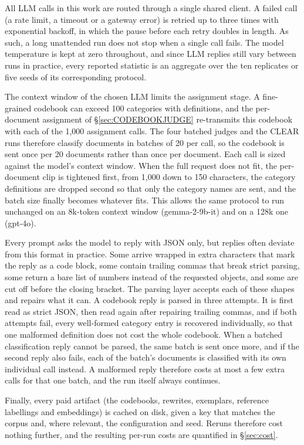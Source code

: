 \documentclass[11pt,a4paper,oneside]{report}
\begin{document}
All LLM calls in this work are routed through a single shared client. A failed call (a rate limit, a timeout or a gateway error) is retried up to three times with exponential backoff, in which the pause before each retry doubles in length. As such, a long unattended run does not stop when a single call fails. The model temperature is kept at zero throughout, and since LLM replies still vary between runs in practice, every reported statistic is an aggregate over the ten replicates or five seeds of its corresponding protocol.

The context window of the chosen LLM limits the assignment stage. A fine-grained codebook can exceed 100 categories with definitions, and the per-document assignment of \S\ref{sec:CODEBOOKJUDGE} re-transmits this codebook with each of the 1{,}000 assignment calls. The four batched judges and the CLEAR runs therefore classify documents in batches of 20 per call, so the codebook is sent once per 20 documents rather than once per document. Each call is sized against the model's context window. When the full request does not fit, the per-document clip is tightened first, from 1{,}000 down to 150 characters, the category definitions are dropped second so that only the category names are sent, and the batch size finally becomes whatever fits. This allows the same protocol to run unchanged on an 8k-token context window ({\small\ttfamily gemma-2-9b-it}) and on a 128k one ({\small\ttfamily gpt-4o}).


Every prompt asks the model to reply with JSON only, but replies often deviate from this format in practice. Some arrive wrapped in extra characters that mark the reply as a code block, some contain trailing commas that break strict parsing, some return a bare list of numbers instead of the requested objects, and some are cut off before the closing bracket. The parsing layer accepts each of these shapes and repairs what it can. A codebook reply is parsed in three attempts. It is first read as strict JSON, then read again after repairing trailing commas, and if both attempts fail, every well-formed category entry is recovered individually, so that one malformed definition does not cost the whole codebook. When a batched classification reply cannot be parsed, the same batch is sent once more, and if the second reply also fails, each of the batch's documents is classified with its own individual call instead. A malformed reply therefore costs at most a few extra calls for that one batch, and the run itself always continues.

Finally, every paid artifact (the codebooks, rewrites, exemplars, reference labellings and embeddings) is cached on disk, given a key that matches the corpus and, where relevant, the configuration and seed. Reruns therefore cost nothing further, and the resulting per-run costs are quantified in \S\ref{sec:cost}.
\end{document}
